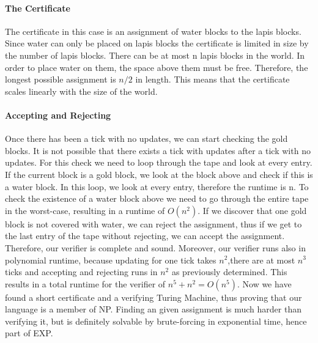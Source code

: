 	\paragraph{The Certificate}
	The certificate in this case is an assignment of water blocks to the lapis blocks.
	Since water can only be placed on lapis blocks the certificate is limited in size by the number of lapis blocks.
	There can be at most n lapis blocks in the world. In order to place water on them, the space above them must be free.
	Therefore, the longest possible assignment is $n/2$ in length. This means that the certificate scales linearly with the size of the world.
	
	
 	\paragraph{Accepting and Rejecting}
	Once there has been a tick with no updates, we can start checking the gold blocks. It is not possible that there exists a tick with updates after a tick with no updates. For this check we need to loop through the tape and look at every entry. If the current block is a gold block, we look at the block above and check if this is a water block. In this loop, we look at every entry, therefore the runtime is n. To check the existence of a water block above we need to go through the entire tape in the worst-case, resulting in a runtime of $O(n^{2})$. If we discover that one gold block is not covered with water, we can reject the assignment, thus if we get to the last entry of the tape without rejecting, we can accept the assignment. Therefore, our verifier is complete and sound. Moreover, our verifier runs also in polynomial runtime, because updating for one tick takes $n^{2}$,there are at most $n^{3}$ ticks and accepting and rejecting runs in $n^{2}$ as previously determined. This results in a total runtime for the verifier of $n^5 + n^2 = O(n^5)$.
	\newline\newline Now we have found a short certificate and a verifying Turing Machine, thus proving that our language is a member of NP. Finding an given assignment is much harder than verifying it, but is definitely solvable by brute-forcing in exponential time, hence part of EXP.
